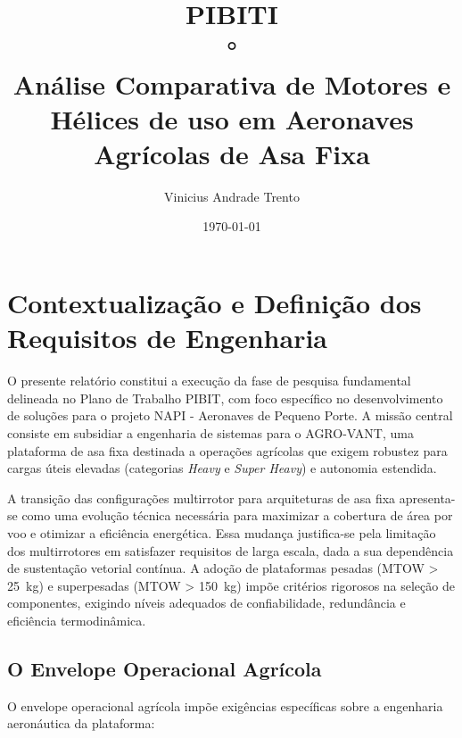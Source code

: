 \documentclass[a4paper,12pt]{article}
\title{\textbf{PIBITI}\\ °\\Análise Comparativa de Motores e Hélices de uso em Aeronaves Agrícolas de Asa Fixa}
\author{Vinicius Andrade Trento}
\date{\today}
\begin{document}
\maketitle
\newpage
\tableofcontents
\newpage


\section{Contextualização e Definição dos Requisitos de Engenharia}

O presente relatório constitui a execução da fase de pesquisa fundamental delineada no Plano de Trabalho PIBIT, com foco específico no desenvolvimento de soluções para o projeto NAPI - Aeronaves de Pequeno Porte. A missão central consiste em subsidiar a engenharia de sistemas para o AGRO-VANT, uma plataforma de asa fixa destinada a operações agrícolas que exigem robustez para cargas úteis elevadas (categorias \textit{Heavy} e \textit{Super Heavy}) e autonomia estendida.

A transição das configurações multirrotor para arquiteturas de asa fixa apresenta-se como uma evolução técnica necessária para maximizar a cobertura de área por voo e otimizar a eficiência energética. Essa mudança justifica-se pela limitação dos multirrotores em satisfazer requisitos de larga escala, dada a sua dependência de sustentação vetorial contínua. A adoção de plataformas pesadas (MTOW > \SI{25}{kg}) e superpesadas (MTOW > \SI{150}{kg}) impõe critérios rigorosos na seleção de componentes, exigindo níveis adequados de confiabilidade, redundância e eficiência termodinâmica.

\subsection{O Envelope Operacional Agrícola}
O envelope operacional agrícola impõe exigências específicas sobre a engenharia aeronáutica da plataforma:
\end{document}
